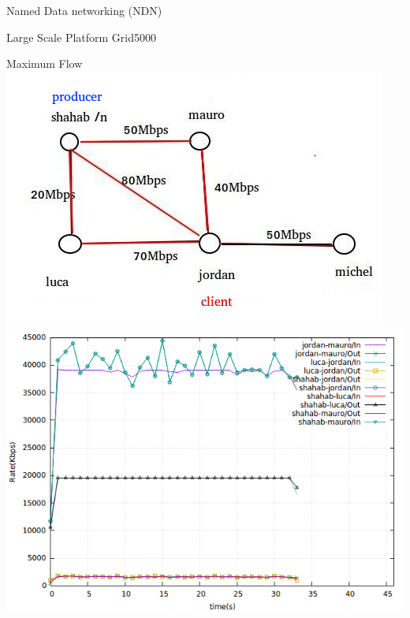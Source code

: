 \documentclass[8pt]{beamer}
\newcommand{\1}{\mathbbm 1}
\begin{document}
\begin{frame}{Named Data networking (NDN)}
\begin{frame}{Large Scale Platform Grid5000}
\begin{frame}{Maximum Flow}
{\includegraphics[scale=0.32]{figures/MaxFlow.png} 
\includegraphics[scale=0.22]{figures/maxflow.png} 
}
\end{frame}
\end{frame}
\end{frame}
\end{document}
